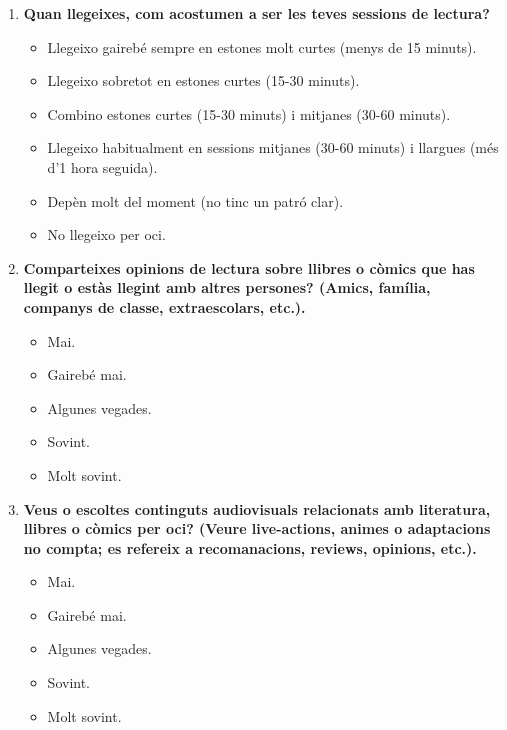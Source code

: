 \documentclass[12pt]{article}
\begin{document}
\begin{enumerate}
    \item \textbf{Quan llegeixes, com acostumen a ser les teves sessions de lectura?}
    \begin{itemize}
        \item[$\square$] Llegeixo gairebé sempre en estones molt curtes (menys de 15 minuts).
        \item[$\square$] Llegeixo sobretot en estones curtes (15-30 minuts).
        \item[$\square$] Combino estones curtes (15-30 minuts) i mitjanes (30-60 minuts).
        \item[$\square$] Llegeixo habitualment en sessions mitjanes (30-60 minuts) i llargues (més d'1 hora seguida).
        \item[$\square$] Depèn molt del moment (no tinc un patró clar).
        \item[$\square$] No llegeixo per oci.
    \end{itemize}

    \item \textbf{Comparteixes opinions de lectura sobre llibres o còmics que has llegit o estàs llegint amb altres persones? (Amics, família, companys de classe, extraescolars, etc.).}
    \begin{itemize}
        \item[$\square$] Mai.
        \item[$\square$] Gairebé mai.
        \item[$\square$] Algunes vegades.
        \item[$\square$] Sovint.
        \item[$\square$] Molt sovint.
    \end{itemize}

    \item \textbf{Veus o escoltes continguts audiovisuals relacionats amb literatura, llibres o còmics per oci? (Veure live-actions, animes o adaptacions no compta; es refereix a recomanacions, reviews, opinions, etc.).}
    \begin{itemize}
        \item[$\square$] Mai.
        \item[$\square$] Gairebé mai.
        \item[$\square$] Algunes vegades.
        \item[$\square$] Sovint.
        \item[$\square$] Molt sovint.
    \end{itemize}
\end{enumerate}
\end{document}
